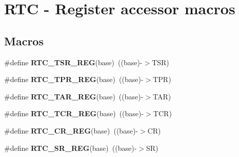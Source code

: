 \hypertarget{group___r_t_c___register___accessor___macros}{}\section{R\+TC -\/ Register accessor macros}
\label{group___r_t_c___register___accessor___macros}
\subsection*{Macros}
\begin{DoxyCompactItemize}
\item 
\mbox{\label{group___r_t_c___register___accessor___macros_ga8e35afa52e674ff535ecc57472498ca8}} 
\#define {\bfseries R\+T\+C\+\_\+\+T\+S\+R\+\_\+\+R\+EG}(base)~((base)-\/$>$T\+SR)
\item 
\mbox{\label{group___r_t_c___register___accessor___macros_gac08a2bfcaf64e65e8192ea268057da7c}} 
\#define {\bfseries R\+T\+C\+\_\+\+T\+P\+R\+\_\+\+R\+EG}(base)~((base)-\/$>$T\+PR)
\item 
\mbox{\label{group___r_t_c___register___accessor___macros_ga161cb8068d36702819a6097fa4716025}} 
\#define {\bfseries R\+T\+C\+\_\+\+T\+A\+R\+\_\+\+R\+EG}(base)~((base)-\/$>$T\+AR)
\item 
\mbox{\label{group___r_t_c___register___accessor___macros_ga4659f1e235bf0cbc0ec63c689645761b}} 
\#define {\bfseries R\+T\+C\+\_\+\+T\+C\+R\+\_\+\+R\+EG}(base)~((base)-\/$>$T\+CR)
\item 
\mbox{\label{group___r_t_c___register___accessor___macros_ga32aa9fd38e099ee1a01f094e5389a794}} 
\#define {\bfseries R\+T\+C\+\_\+\+C\+R\+\_\+\+R\+EG}(base)~((base)-\/$>$CR)
\item 
\mbox{\label{group___r_t_c___register___accessor___macros_gab87ebfc55a2b4e49ef0c0a52819e27b0}} 
\#define {\bfseries R\+T\+C\+\_\+\+S\+R\+\_\+\+R\+EG}(base)~((base)-\/$>$SR)
\item 
\mbox{\label{group___r_t_c___register___accessor___macros_gab021dc45ed50ff0798b8892ea750b0ff}} 

\end{DoxyCompactItemize}
